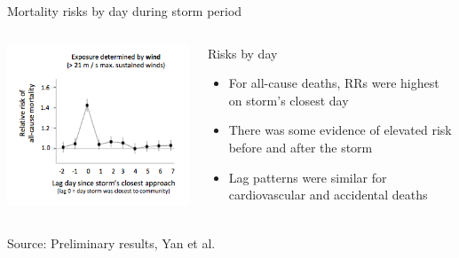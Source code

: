 \documentclass[ignorenonframetext,]{beamer}
\begin{document}
\begin{frame}{Mortality risks by day during storm period}

\begin{columns}
\begin{column}{0.6\textwidth}  
    \begin{center}
     \includegraphics[width=\textwidth]{figures/all_cause_lags.png}
     \end{center}
\end{column}
\begin{column}{0.4\textwidth}
\footnotesize
\begin{block}{Risks by day}
\footnotesize
\begin{itemize}
  \item For all-cause deaths, RRs were highest on storm's closest day
  \item There was some evidence of elevated risk before and after the storm
  \item Lag patterns were similar for cardiovascular and accidental deaths
\end{itemize}
\end{block}
\end{column}
\end{columns}

\footnotesize Source: Preliminary results, Yan et al.

\end{frame}
\end{document}
